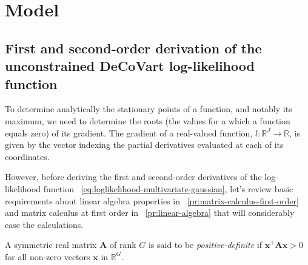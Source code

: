 \documentclass[long, final]{jobim}
\newcommand \RR {\mathbb{R}}
\begin{document}
 


 \appendix

\section{Model}


\subsection{First and second-order derivation of the unconstrained DeCoVart log-likelihood function}
\label{subsubsec:uncontrained-optimisation}

To determine analytically the stationary points of a function, and notably its maximum, we need to determine the roots (the values for a which a function equals zero) of its gradient.  The gradient of a real-valued function, $l:\RR^J \to \RR$, is given by the vector indexing the partial derivatives evaluated at each of its coordinates. 

However, before deriving the first and second-order derivatives of the log-likelihood function \equationname~\ref{eq:loglikelihood-multivariate-gaussian}, let's review basic requirements about linear algebra properties in \propertyname~\ref{pr:matrix-calculus-first-order} and matrix calculus at first order in \propertyname~\ref{pr:linear-algebra} that will considerably ease the calculations. 

\begin{definition}
\label{def:positive-definite}
A symmetric real matrix $\boldsymbol{A}$ of rank $G$ is said to be \textit{positive-definite} if $\boldsymbol{x}^\top \boldsymbol{A} \boldsymbol{x} > 0$ for all non-zero vectors $\boldsymbol{x}$ in $\mathbb{R}^G$.
\end{definition}
\end{document}
